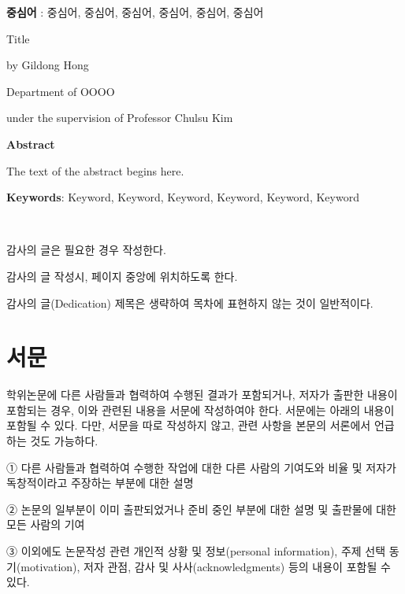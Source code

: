 \documentclass[11pt]{report}
\numberwithin{figure}{chapter}
\begin{document}
\textbf{중심어} : 중심어, 중심어, 중심어, 중심어, 중심어, 중심어

\newpage
\begin{center}
\LARGE Title
\par\vspace{20pt}
\doublespacing
\normalsize by Gildong Hong\par
Department of OOOO\par
under the supervision of Professor Chulsu Kim

\par\vspace{20pt}
\LARGE \textbf{Abstract}
\end{center}

\justifying %
\doublespacing
\normalsize
The text of the abstract begins here. 
\par\vspace{1cm}

\textbf{Keywords}: Keyword, Keyword, Keyword, Keyword, Keyword, Keyword

\newpage
~
\vspace{5.5cm} \par
\begin{center}
감사의 글은 필요한 경우 작성한다.\par
감사의 글 작성시, 페이지 중앙에 위치하도록 한다.\par
감사의 글(Dedication) 제목은 생략하여 목차에 표현하지 않는 것이 일반적이다.
\end{center}

\newpage
{}
\chapter*{서문}

\normalsize
학위논문에 다른 사람들과 협력하여 수행된 결과가 포함되거나, 저자가 출판한 내용이 포함되는 경우, 이와 관련된 내용을 서문에 작성하여야 한다. 서문에는 아래의 내용이 포함될 수 있다. 다만, 서문을 따로 작성하지 않고, 관련 사항을 본문의 서론에서 언급하는 것도 가능하다. \par

① 다른 사람들과 협력하여 수행한 작업에 대한 다른 사람의 기여도와 비율 및 저자가 독창적이라고 주장하는 부분에 대한 설명\par
② 논문의 일부분이 이미 출판되었거나 준비 중인 부분에 대한 설명 및 출판물에 대한 모든 사람의 기여\par
③ 이외에도 논문작성 관련 개인적 상황 및 정보(personal information), 주제 선택 동기(motivation), 저자 관점, 감사 및 사사(acknowledgments) 등의 내용이 포함될 수 있다.\par
\end{document}
